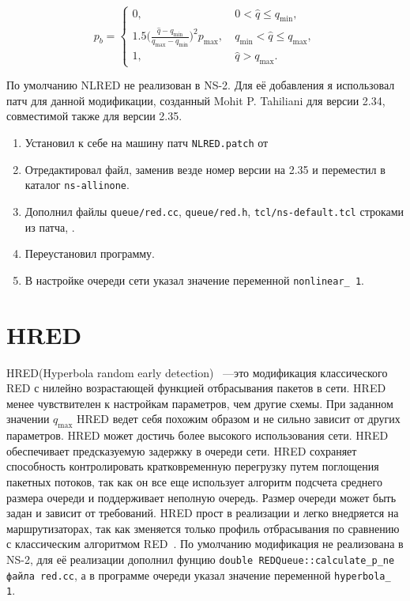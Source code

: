 \begin{equation}
\label{nlred}
p_{b} = \begin{cases}
        0, &  \ 0 < \hat{q} \leqslant q_{\min},
        \\
        1.5({\frac{\hat{q} - q_{\min}}{q_{\max} - q_{\min}})^2} {p_{\max}}, & \ q_{\min} < \hat{q} \leqslant q_{\max},
        \\
        1, &  \ \hat{q} > q_{\max}.
\end{cases}
\end{equation}


По умолчанию NLRED не реализован в NS-2. Для её добавления я использовал патч для данной модификации, созданный Mohit
  P. Tahiliani для версии 2.34, совместимой также для версии 2.35. 
  
\begin{enumerate}
\item Установил к себе на машину патч \verb|NLRED.patch| от 
\item Отредактировал файл, заменив везде номер версии на 2.35 и переместил в каталог \verb|ns-allinone|.
\item Дополнил файлы \verb|queue/red.cc|, \verb|queue/red.h|, \verb|tcl/ns-default.tcl| строками из патча, .
\item Переустановил программу.
\item В настройке очереди сети указал значение переменной \verb|nonlinear_ 1|.
\end{enumerate}
 
 
\section{HRED}
\label{chap2:sec6}

 
 
HRED(Hyperbola random early detection) ~---это модификация классического RED с нилейно возрастающей функцией отбрасывания пакетов в сети.
HRED менее чувствителен к настройкам параметров, чем другие схемы. При заданном значении $q_{\max}$ HRED ведет себя похожим образом и не сильно зависит от других параметров.
HRED может достичь более высокого использования сети. HRED обеспечивает предсказуемую задержку в очереди сети. HRED сохраняет способность контролировать кратковременную перегрузку путем поглощения пакетных потоков, так как он все еще использует алгоритм подсчета среднего размера очереди и поддерживает неполную очередь. Размер очереди может быть задан и зависит от требований. HRED прост в реализации и легко внедряется на маршрутизаторах, так как зменяется только профиль отбрасывания по сравнению с классическим алгоритмом RED~\cite{HRED}. По умолчанию модификация не реализована в NS-2, для её реализации дополнил фунцию \verb|double REDQueue::calculate_p_ne файла red.cc|, а в программе очереди указал значение переменной \verb|hyperbola_ 1|.
 
